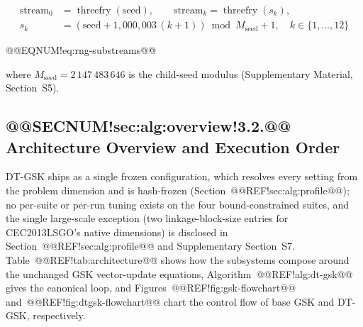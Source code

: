\documentclass[10pt,a4paper]{article}
\newcommand{\dtgsk}{DT-GSK}
\begin{document}
\[
\begin{aligned}
\text{stream}_0 &= \operatorname{threefry}(\text{seed}),
\qquad
\text{stream}_k = \operatorname{threefry}(s_k),\\
s_k &= (\text{seed} + 1{,}000{,}003\,(k{+}1)) \bmod M_{\mathrm{seed}} + 1,
\quad k \in \{1,\dots,12\}
\end{aligned}
\]

@@EQNUM!eq:rng-substreams@@

where $M_{\mathrm{seed}} = 2\,147\,483\,646$ is the child-seed modulus
(Supplementary Material, Section~S5).





\subsection{@@SECNUM!sec:alg:overview!3.2.@@ Architecture Overview and Execution Order}\label{sec:alg:overview}


\dtgsk{} ships as a single frozen configuration,
which resolves every setting from the problem dimension and is
hash-frozen (Section~@@REF!sec:alg:profile@@); no per-suite or per-run
tuning exists on the four bound-constrained suites, and the single
large-scale exception (two linkage-block-size entries for
CEC2013LSGO's native dimensions) is disclosed in
Section~@@REF!sec:alg:profile@@ and Supplementary Section~S7.
Table~@@REF!tab:architecture@@ shows how the subsystems compose around
the unchanged GSK vector-update equations, Algorithm~@@REF!alg:dt-gsk@@ gives the
canonical loop, and Figures~@@REF!fig:gsk-flowchart@@
and~@@REF!fig:dtgsk-flowchart@@ chart the control flow of base GSK and
\dtgsk{}, respectively.
\end{document}
